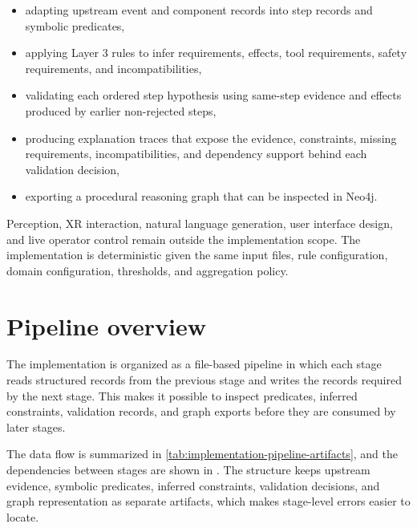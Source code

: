 \begin{itemize}
    \item adapting upstream event and component records into step records and symbolic predicates,
    \item applying Layer 3 rules to infer requirements, effects, tool requirements, safety requirements, and incompatibilities,
    \item validating each ordered step hypothesis using same-step evidence and effects produced by earlier non-rejected steps,
    \item producing explanation traces that expose the evidence, constraints, missing requirements, incompatibilities, and dependency support behind each validation decision,
    \item exporting a procedural reasoning graph that can be inspected in Neo4j.
\end{itemize}

Perception, XR interaction, natural language generation, user interface design, and live operator control remain outside the implementation scope. The implementation is deterministic given the same input files, rule configuration, domain configuration, thresholds, and aggregation policy.

\section{Pipeline overview}
\label{sec:implementation-pipeline-overview}

The implementation is organized as a file-based pipeline in which each stage reads structured records from the previous stage and writes the records required by the next stage. This makes it possible to inspect predicates, inferred constraints, validation records, and graph exports before they are consumed by later stages.

The data flow is summarized in \cref{tab:implementation-pipeline-artifacts}, and the dependencies between stages are shown in . The structure keeps upstream evidence, symbolic predicates, inferred constraints, validation decisions, and graph representation as separate artifacts, which makes stage-level errors easier to locate.

